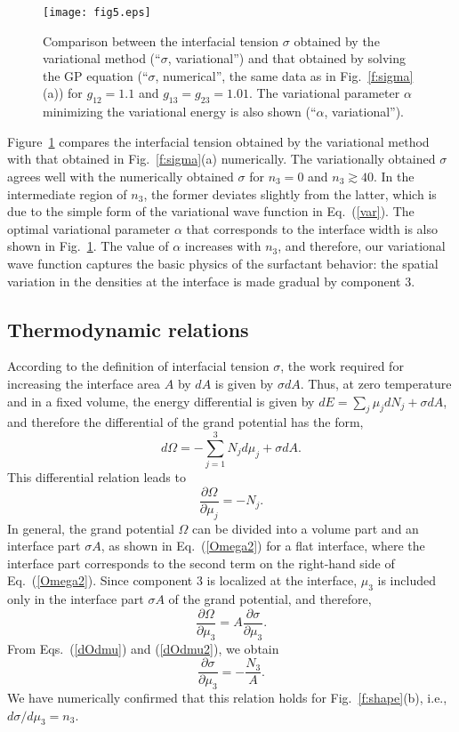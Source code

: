 \documentclass[pra,aps,superscriptaddress,twocolumn,color]{revtex4-1}
\begin{document}
\begin{figure}[tb]
\texttt{[image: fig5.eps]}
\caption{
  Comparison between the interfacial tension $\sigma$ obtained by the
  variational method (``$\sigma$, variational'') and that obtained by
  solving the GP equation (``$\sigma$, numerical'', the same data as in
  Fig.~\ref{f:sigma}(a)) for $g_{12} = 1.1$ and $g_{13} = g_{23} = 1.01$.
  The variational parameter $\alpha$ minimizing the variational energy
  is also shown (``$\alpha$, variational'').
}
\label{f:var}
\end{figure}
Figure~\ref{f:var} compares the interfacial tension obtained by the
variational method with that obtained in Fig.~\ref{f:sigma}(a) numerically.
The variationally obtained $\sigma$ agrees well with the numerically
obtained $\sigma$ for $n_3 = 0$ and $n_3 \gtrsim 40$.
In the intermediate region of $n_3$, the former deviates slightly from the
latter, which is due to the simple form of the variational wave function in
Eq.~(\ref{var}).
The optimal variational parameter $\alpha$ that corresponds to the interface
width is also shown in Fig.~\ref{f:var}.
The value of $\alpha$ increases with $n_3$, and therefore, our variational
wave function captures the basic physics of the surfactant behavior:
the spatial variation in the densities at the interface is made gradual by
component 3.


\subsection{Thermodynamic relations}

According to the definition of interfacial tension $\sigma$, the work
required for increasing the interface area $A$ by $dA$ is given by $\sigma 
dA$.
Thus, at zero temperature and in a fixed volume, the energy differential is
given by $dE = \sum_j \mu_j dN_j + \sigma dA$, and therefore the
differential of the grand potential has the form,
\begin{equation} \label{dOmega}
d\Omega = -\sum_{j=1}^3 N_j d\mu_j + \sigma dA.
\end{equation}
This differential relation leads to
\begin{equation} \label{dOdmu}
\frac{\partial \Omega}{\partial \mu_j} = -N_j.
\end{equation}
In general, the grand potential $\Omega$ can be divided into a volume part
and an interface part $\sigma A$, as shown in Eq.~(\ref{Omega2}) for a flat
interface, where the interface part corresponds to the second term on the
right-hand side of Eq.~(\ref{Omega2}).
Since component 3 is localized at the interface, $\mu_3$ is included only in
the interface part $\sigma A$ of the grand potential, and therefore,
\begin{equation} \label{dOdmu2}
  \frac{\partial \Omega}{\partial \mu_3} =
  A \frac{\partial \sigma}{\partial \mu_3}.
\end{equation}
From Eqs.~(\ref{dOdmu}) and (\ref{dOdmu2}), we obtain
\begin{equation} \label{dsdmu}
  \frac{\partial \sigma}{\partial \mu_3} = -\frac{N_3}{A}.
\end{equation}
We have numerically confirmed that this relation holds for
Fig.~\ref{f:shape}(b), i.e., $d \sigma / d \mu_3 = n_3$.
\end{document}
